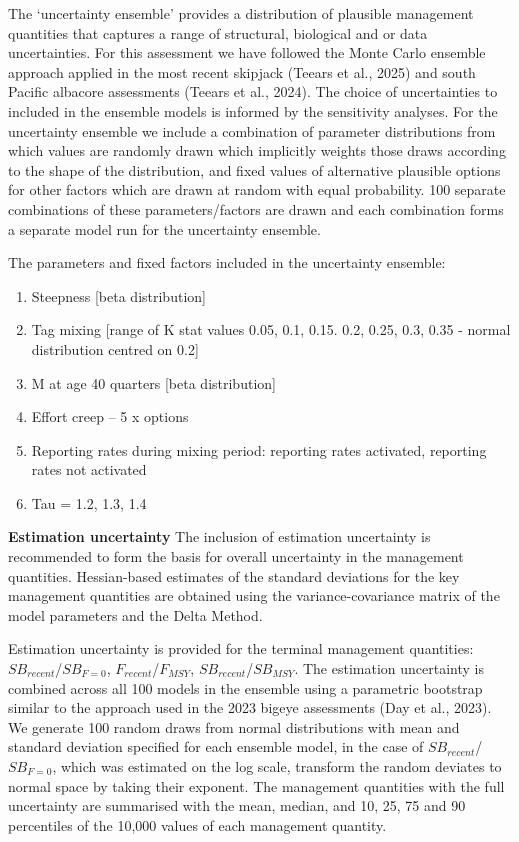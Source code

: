 \documentclass[
  english,
  a4paper,
  a4paper,
  11pt]{SCreport}
\begin{document}
The `uncertainty ensemble' provides a distribution of plausible
management quantities that captures a range of structural, biological
and or data uncertainties. For this assessment we have followed the
Monte Carlo ensemble approach applied in the most recent skipjack
(Teears et al., 2025) and south Pacific albacore assessments (Teears et
al., 2024). The choice of uncertainties to included in the ensemble
models is informed by the sensitivity analyses. For the uncertainty
ensemble we include a combination of parameter distributions from which
values are randomly drawn which implicitly weights those draws according
to the shape of the distribution, and fixed values of alternative
plausible options for other factors which are drawn at random with equal
probability. 100 separate combinations of these parameters/factors are
drawn and each combination forms a separate model run for the
uncertainty ensemble.

The parameters and fixed factors included in the uncertainty ensemble:

\begin{enumerate}
\def\labelenumi{\arabic{enumi}.}
\item
  Steepness {[}beta distribution{]}
\item
  Tag mixing {[}range of K stat values 0.05, 0.1, 0.15. 0.2, 0.25, 0.3,
  0.35 - normal distribution centred on 0.2{]}
\item
  M at age 40 quarters {[}beta distribution{]}
\item
  Effort creep -- 5 x options
\item
  Reporting rates during mixing period: reporting rates activated,
  reporting rates not activated
\item
  Tau = 1.2, 1.3, 1.4
\end{enumerate}

\textbf{Estimation uncertainty} The inclusion of estimation uncertainty
is recommended to form the basis for overall uncertainty in the
management quantities. Hessian-based estimates of the standard
deviations for the key management quantities are obtained using the
variance-covariance matrix of the model parameters and the Delta Method.

Estimation uncertainty is provided for the terminal management
quantities: \(SB_{recent}\)/\(SB_{F=0}\), \(F_{recent}\)/\(F_{MSY}\),
\(SB_{recent}\)/\(SB_{MSY}\). The estimation uncertainty is combined
across all 100 models in the ensemble using a parametric bootstrap
similar to the approach used in the 2023 bigeye assessments (Day et al.,
2023). We generate 100 random draws from normal distributions with mean
and standard deviation specified for each ensemble model, in the case of
\(SB_{recent}\)/\(SB_{F=0}\), which was estimated on the log scale,
transform the random deviates to normal space by taking their exponent.
The management quantities with the full uncertainty are summarised with
the mean, median, and 10, 25, 75 and 90 percentiles of the 10,000 values
of each management quantity.
\end{document}
